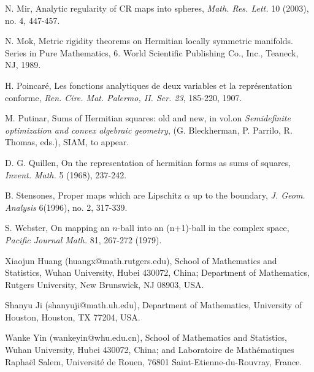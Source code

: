 \documentclass[12pt]{article}
\numberwithin{equation}{section}
\begin{document}
\begin{thebibliography}{99999}
N. Mir,  { Analytic regularity of CR maps into spheres}, {\it Math.
Res. Lett.} 10 (2003), no. 4, 447-457.

 N. Mok, Metric rigidity theorems on Hermitian
locally symmetric manifolds. Series in Pure Mathematics, 6. World
Scientific Publishing Co., Inc., Teaneck, NJ, 1989.


 H. Poincar\'e, { Les fonctions analytiques de deux variables et
la repr\'esentation conforme}, {\it Ren. Cire. Mat. Palermo, II.
Ser. 23}, 185-220, 1907.

 M. Putinar, Sums of Hermitian squares: old and new, in
vol.on {\it Semidefinite optimization and convex algebraic
geometry}, (G. Bleckherman, P. Parrilo, R. Thomas, eds.), SIAM, to
appear.

 D. G. Quillen, On the representation of hermitian forms as
sums of squares, {\it Invent. Math.} 5 (1968), 237-242.


 B. Stensones, Proper maps which are Lipschitz $\alpha$
up to the boundary, {\it J. Geom. Analysis} 6(1996), no. 2, 317-339.


 S. Webster, { On mapping an $n$-ball into an
(n+1)-ball in the complex space}, {\it Pacific Journal Math.} 81,
267-272 (1979).







\bigskip
\noindent Xiaojun Huang (huangx@math.rutgers.edu), School of
Mathematics and Statistics, Wuhan University, Hubei 430072, China;
Department of Mathematics, Rutgers University, New Brunswick, NJ
08903, USA.

\medskip
  \noindent Shanyu Ji (shanyuji@math.uh.edu), Department of
Mathematics, University of Houston, Houston, TX 77204, USA.

\medskip
\noindent Wanke Yin (wankeyin@whu.edu.cn),  School of Mathematics
and Statistics, Wuhan University, Hubei 430072, China;
 and Laboratoire de Math\'ematiques Rapha\"{e}l Salem,
 Universit\'e de Rouen, 76801 Saint-Etienne-du-Rouvray, France.


\end{thebibliography}
\end{document}
